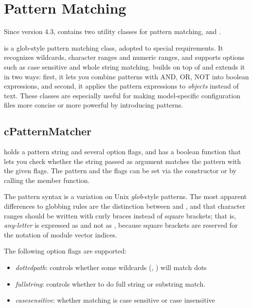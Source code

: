 \section{Pattern Matching}

Since version 4.3, {\opp} contains two utility classes for pattern
matching,  and .

 is a glob-style pattern matching class, adopted to
special {\opp} requirements. It recognizes wildcards, character ranges and
numeric ranges, and supports options such as case sensitive and whole
string matching.  builds on top of
 and extends it in two ways: first, it lets you
combine patterns with AND, OR, NOT into boolean expressions, and second, it
applies the pattern expressions to \textit{objects} instead of text. These
classes are especially useful for making model-specific configuration files
more concise or more powerful by introducing patterns.



\subsection{cPatternMatcher}

 holds a pattern string and several option flags, and has
a boolean  function that lets you check whether the string passed as argument
matches the pattern with the given flags. The pattern and the flags can be set
via the constructor or by calling the  member function.

The pattern syntax is a variation on Unix \textit{glob}-style patterns. The
most apparent differences to globbing rules are the distinction between
\ttt{*} and \ttt{**}, and that character ranges should be written with
curly braces instead of square brackets; that is, \textit{any-letter} is
expressed as  and not as \ttt{[a-zA-Z]}, because square
brackets are reserved for the notation of module vector indices.

The following option flags are supported:

\begin{itemize}
  \item \textit{dottedpath}: controls whether some wildcards (, \ttt{*}) will match dots
  \item \textit{fullstring}: controls whether to do full string or substring match.
  \item \textit{casesensitive}: whether matching is case sensitive or case insensitive
\end{itemize}


